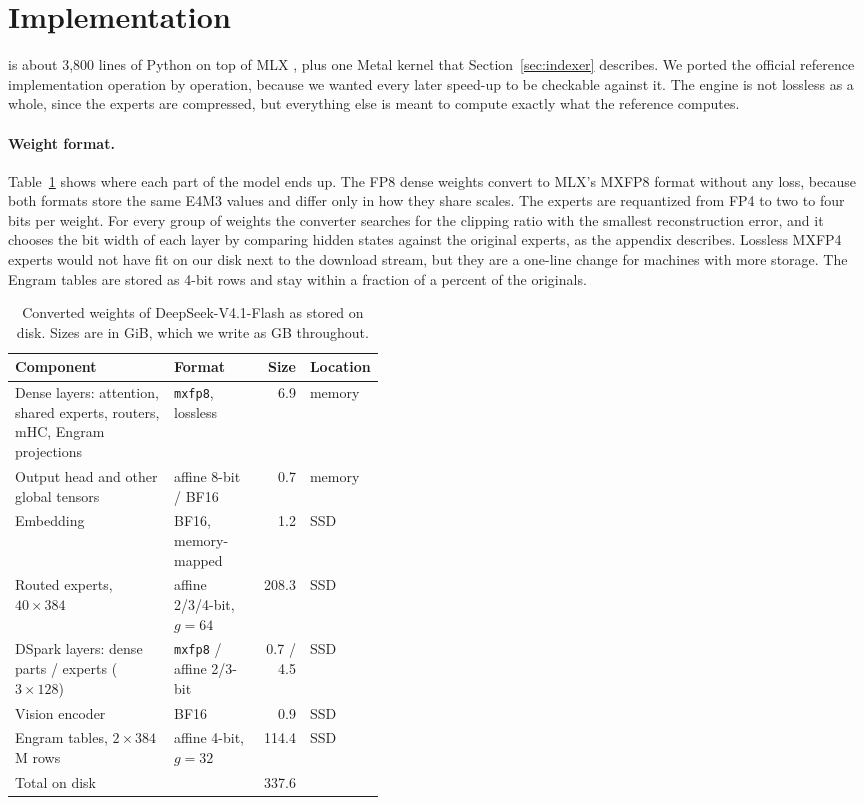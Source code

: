 \section{Implementation}
\label{sec:impl}
\method{} is about 3,800 lines of Python on top of MLX \citep{mlx}, plus one Metal kernel that Section~\ref{sec:indexer} describes. We ported the official reference implementation operation by operation, because we wanted every later speed-up to be checkable against it. The engine is not lossless as a whole, since the experts are compressed, but everything else is meant to compute exactly what the reference computes.

\paragraph{Weight format.} Table~\ref{tab:format} shows where each part of the model ends up. The FP8 dense weights convert to MLX's MXFP8 format without any loss, because both formats store the same E4M3 values and differ only in how they share scales. The experts are requantized from FP4 to two to four bits per weight. For every group of weights the converter searches for the clipping ratio with the smallest reconstruction error, and it chooses the bit width of each layer by comparing hidden states against the original experts, as the appendix describes. Lossless MXFP4 experts would not have fit on our disk next to the download stream, but they are a one-line change for machines with more storage. The Engram tables are stored as 4-bit rows and stay within a fraction of a percent of the originals.

\begin{table}[t]
\centering
\small
\caption{Converted weights of DeepSeek-V4.1-Flash as stored on disk. Sizes are in GiB, which we write as GB throughout.}
\label{tab:format}
\begin{tabular}{@{}p{0.43\linewidth}lrl@{}}
\toprule
Component & Format & Size & Location \\
\midrule
Dense layers: attention, shared experts, routers, mHC, Engram projections & \texttt{mxfp8}, lossless & 6.9 & memory \\
Output head and other global tensors & affine 8-bit / BF16 & 0.7 & memory \\
Embedding & BF16, memory-mapped & 1.2 & SSD \\
Routed experts, $40\times384$ & affine 2/3/4-bit, $g=64$ & 208.3 & SSD \\
DSpark layers: dense parts / experts ($3\times128$) & \texttt{mxfp8} / affine 2/3-bit & 0.7 / 4.5 & SSD \\
Vision encoder & BF16 & 0.9 & SSD \\
Engram tables, $2\times384$M rows & affine 4-bit, $g=32$ & 114.4 & SSD \\
\midrule
Total on disk & & 337.6 & \\
\bottomrule
\end{tabular}
\end{table}

